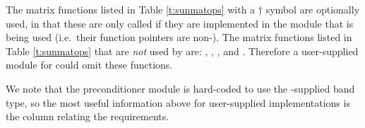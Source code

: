 The matrix functions listed in Table \ref{t:sunmatops} with
a $\dagger$ symbol are optionally used, in that these are only called
if they are implemented in the {\sunmatrix} module that is being used
(i.e.~their function pointers are non-).  The matrix
functions listed in Table \ref{t:sunmatops} that are {\em not} used by 
{\kinsol} are: , , ,
 and . Therefore a user-supplied
{\sunmatrix} module for {\kinsol} could omit these functions.

We note that the {\kinbbdpre} preconditioner module is hard-coded to
use the {\sundials}-supplied band {\sunmatrix} type, so the most
useful information above for user-supplied {\sunmatrix}
implementations is the column relating the {\kinls} requirements. 

